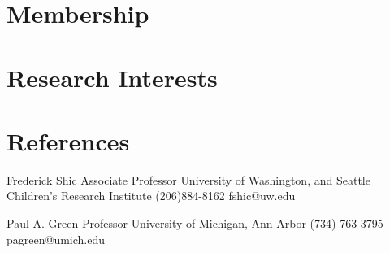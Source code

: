 \documentclass[11pt,letterpaper,roman]{moderncv} %
\begin{document}
\section{Membership}



\section{Research Interests}

\renewcommand{\listitemsymbol}{-~} %



\section{References}

\cventry{}
{Frederick Shic}
{\newline{}Associate Professor}
{\newline{}University of Washington, and Seattle Children's Research Institute}{}
{
(206)884-8162
\newline{}fshic@uw.edu
\newline{}
}

\cventry{}
{Paul A. Green}
{\newline{}Professor}
{\newline{}University of Michigan, Ann Arbor}{}
{
(734)-763-3795
\newline{}pagreen@umich.edu
\newline{}
}
\end{document}
